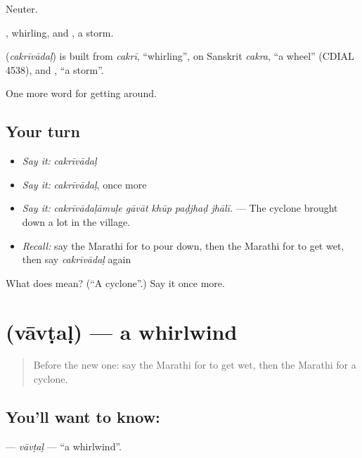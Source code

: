 Neuter.

, whirling, and , a storm.

\begin{cousinweb}
\textbf{} (\emph{cakrīvādaḷ}) is built from \emph{cakrī}, \textquotedblleft{}whirling\textquotedblright{}, on Sanskrit \emph{cakra}, \textquotedblleft{}a wheel\textquotedblright{} (CDIAL 4538), and \textbf{}, \textquotedblleft{}a storm\textquotedblright{}.
\end{cousinweb}

\begin{grammarlens}[title={What you've built}]
One more word for getting around.
\end{grammarlens}

\subsection*{Your turn}
\begin{itemize}
\raggedright
  \item \emph{Say it:} \emph{cakrīvādaḷ}
  \item \emph{Say it:} \emph{cakrīvādaḷ}, once more
  \item \emph{Say it:} \emph{cakrīvādaḷāmuḷe gāvāt khūp paḍjhaḍ jhālī.} — The cyclone brought down a lot in the village.
  \item \emph{Recall:} say the Marathi for to pour down, then the Marathi for to get wet, then say \emph{cakrīvādaḷ} again
\end{itemize}

\begin{tcolorbox}[breakable,colback=teal!4,colframe=teal!35!black,title={Before you move on}]
What does  mean? (\textquotedblleft{}A cyclone\textquotedblright{}.) Say it once more.
\end{tcolorbox}
\section[\texorpdfstring{\mr{वावटळ} (vāvṭaḷ)}{वावटळ (vāvṭaḷ)}]{ (vāvṭaḷ) — a whirlwind}

\label{lesson:MR-C439-vavtal}



\begin{quote}
Before the new one: say the Marathi for to get wet, then the Marathi for a cyclone.
\end{quote}

\subsection*{You'll want to know: }
\textbf{} — \emph{vāvṭaḷ} — \textquotedblleft{}a whirlwind\textquotedblright{}.

